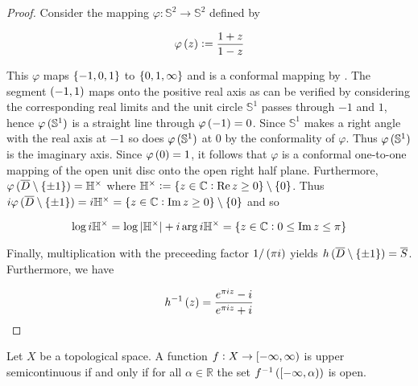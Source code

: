 \begin{proof}
	Consider the mapping $\varphi: \mathbb{S}^2 \to \mathbb{S}^2$ defined by

	\begin{equation*}
		\varphi\del{z} := \frac{1 + z}{1 - z}
	\end{equation*}

	This $\varphi$ maps $\cbr{-1,0,1}$ to $\cbr{0,1,\infty}$ and is a conformal mapping by \cite[278--279]{rudin:rc_analysis:1987}. The segment $\intoo{-1,1}$ maps onto the positive real axis as can be verified by considering the corresponding real limits and the unit circle $\mathbb{S}^1$ passes through $-1$ and $1$, hence $\varphi\del[0]{\mathbb{S}^1}$ is a straight line through $\varphi\del{-1} = 0$. Since $\mathbb{S}^1$ makes a right angle with the real axis at $-1$ so does $\varphi\del[0]{\mathbb{S}^1}$ at $0$ by the conformality of $\varphi$. Thus $\varphi\del[0]{\mathbb{S}^1}$ is the imaginary axis. Since $\varphi\del{0} = 1$, it follows that $\varphi$ is a conformal one-to-one mapping of the open unit disc onto the open right half plane. Furthermore, $\varphi\del[0]{\overline{D}\setminus \cbr{\pm 1}} = \mathbb{H}^\times$ where $\mathbb{H}^\times := \cbr{z \in \mathbb{C} : \Re z \geq 0} \setminus \cbr{0}$. Thus $i\varphi\del[0]{\overline{D}\setminus \cbr{\pm 1}} = i\mathbb{H}^\times = \cbr{z \in \mathbb{C} : \Im z \geq 0} \setminus \cbr{0}$ and so 
	
	\begin{equation*}
		\log i\mathbb{H}^\times = \log \abs[0]{\mathbb{H}^\times} + i \arg i\mathbb{H}^\times = \cbr{z \in \mathbb{C} : 0 \leq \Im z \leq \pi}
	\end{equation*}

	Finally, multiplication with the preceeding factor $1/\del{\pi i}$ yields $h\del[0]{\overline{D} \setminus \cbr{\pm 1}} = \overline{S}$. Furthermore, we have

	\begin{equation*}
		h^{-1}\del{z} = \frac{e^{\pi iz} - i}{e^{\pi i z} + i}
	\end{equation*}
\end{proof}

\begin{lemma*}
	Let $X$ be a topological space. A function $f: X \to \intco[0]{-\infty,\infty}$ is upper semicontinuous if and only if for all $\alpha \in \mathbb{R}$ the set $f^{-1}\del[0]{\intco[0]{-\infty,\alpha}}$ is open. 
\end{lemma*}

